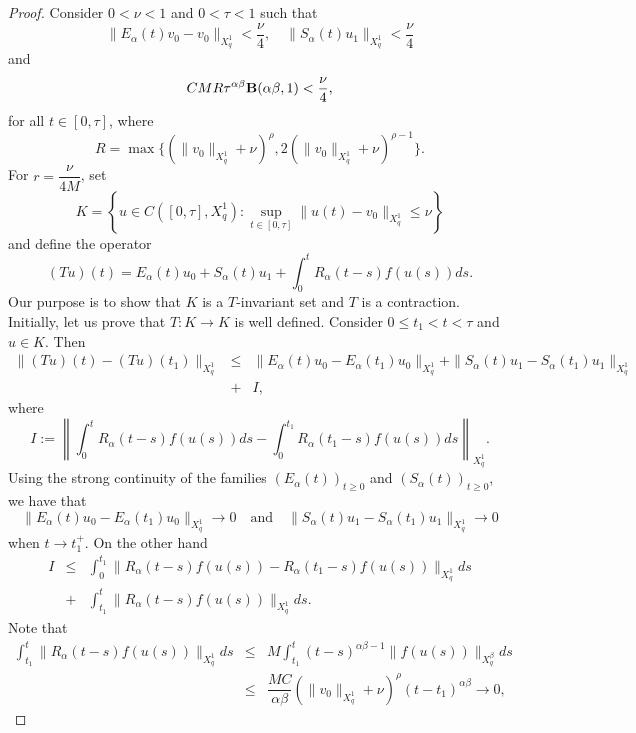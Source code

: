 \documentclass[12pt,reqno]{amsart}
\begin{document}
\begin{proof}
	Consider $0<\nu<1$ and $0<\tau<1$ such that 
	$$\|E_{\alpha}(t)v_0-v_0\|_{X^{1}_{q}}<\dfrac{\nu}{4},\quad \|S_{\alpha}(t)u_1\|_{X^{1}_{q}}<\dfrac{\nu}{4}$$
	and
	$$CMR\tau^{\alpha\beta}{\bf B}(\alpha\beta,1)<\dfrac{\nu}{4},$$
	for all $t\in[0,\tau]$,	where 
	$$R=\max\{(\|v_0\|_{X^{1}_{q}}+ \nu)^{\rho}, 2(\|v_0\|_{X^{1}_{q}}+ \nu)^{\rho-1}\}.$$
	For $r=\dfrac{\nu}{4M}$, set
	$$K=\left\{u\in C([0,\tau], X^{1}_{q}): \sup_{t\in [0,\tau]}\|u(t)-v_0\|_{X^{1}_{q}}\leq\nu\right\}$$
	and define the operator
	$$(Tu)(t)=E_{\alpha}(t)u_0+S_{\alpha}(t)u_1+\int_{0}^{t}R_{\alpha}(t-s)f(u(s))ds.$$
	Our purpose is to show that $K$ is a $T$-invariant set and $T$ is a contraction. Initially, let us prove that $T:K\to K$ is well defined. Consider $0\le t_1<t< \tau$ and $u\in K$. Then
	\begin{eqnarray*}
		\|(Tu)(t)-(Tu)(t_1)\|_{X^{1}_{q}}&\leq& \|E_{\alpha}(t)u_0-E_{\alpha}(t_1)u_0\|_{X^{1}_{q}}+ \|S_{\alpha}(t)u_1-S_{\alpha}(t_1)u_1\|_{X^{1}_{q}}\\
		&+& I,
	\end{eqnarray*}
	where $$I:=\left\|\int_{0}^{t}R_{\alpha}(t-s)f(u(s))ds-\int_{0}^{t_1}R_{\alpha}(t_1-s)f(u(s))ds\right\|_{X^{1}_{q}}.$$
Using the strong continuity of the families $(E_{\alpha}(t))_{t\ge0}$ and $(S_{\alpha}(t))_{t\ge0}$, we have that
	$$\|E_{\alpha}(t)u_0-E_{\alpha}(t_1)u_0\|_{X^{1}_{q}}\rightarrow 0 \quad \mbox{and} \quad \|S_{\alpha}(t)u_1-S_{\alpha}(t_1)u_1\|_{X^{1}_{q}}\rightarrow 0$$
	when $t\rightarrow t_1^+$. On the other hand
	\begin{eqnarray*}
		I&\leq&\int_{0}^{t_1}\|R_{\alpha}(t-s)f(u(s))-R_{\alpha}(t_1-s)f(u(s))\|_{X^{1}_{q}}ds\\
		&+& \int_{t_1}^{t}\|R_{\alpha}(t-s)f(u(s))\|_{X^{1}_{q}}ds.
	\end{eqnarray*} 
	Note that
	\begin{eqnarray*}
		\int_{t_1}^{t}\|R_{\alpha}(t-s)f(u(s))\|_{X^{1}_{q}}ds&\leq& M\int_{t_1}^{t}(t-s)^{\alpha\beta-1}\|f(u(s))\|_{X^{\beta}_{q}}ds\\
		&\leq& \dfrac{MC}{\alpha\beta}(\|v_0\|_{X^{1}_{q}}+\nu)^\rho(t-t_1)^{\alpha\beta}\rightarrow 0,
	\end{eqnarray*}

\end{proof}
\end{document}
